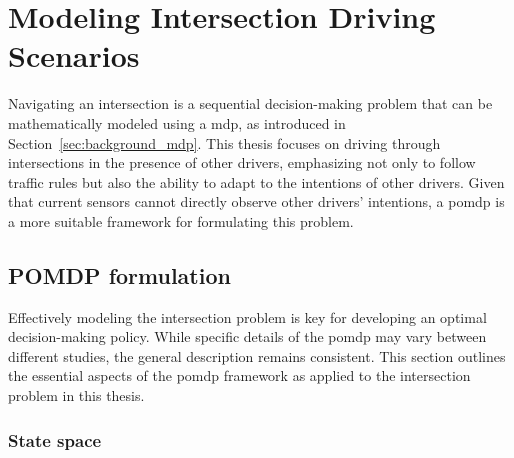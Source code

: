 \newcommand {\matr}[2]{\left[\begin{array}{#1}#2\end{array}\right]}
\newcommand{\E}{\mathbb{E}}
\newcommand{\tr}{\mathrm{tr}}
\newcommand{\x}{{\mathbf{x}}}
\renewcommand{\u}{{\mathbf{u}}}
\newcommand{\w}{{\mathbf{w}}}
\renewcommand{\r}{{\mathbf{r}}}

\chapter{Modeling Intersection Driving Scenarios}
\label{ch:modeling_intersection}

Navigating an intersection is a sequential decision-making problem that can be mathematically modeled using a \gls{mdp}, as introduced in Section~\ref{sec:background_mdp}. This thesis focuses on driving through intersections in the presence of other drivers, emphasizing not only to follow traffic rules but also the ability to adapt to the intentions of other drivers. Given that current sensors cannot directly observe other drivers' intentions, a \gls{pomdp} is a more suitable framework for formulating this problem.

\section{POMDP formulation}
\label{sec:pomdp_fomulation}
Effectively modeling the intersection problem is key for developing an optimal decision-making policy. While specific details of the \gls{pomdp} may vary between different studies, the general description remains consistent. This section outlines the essential aspects of the \gls{pomdp} framework as applied to the intersection problem in this thesis.

\subsection{State space}
\label{sec:pomdp_statespace}

